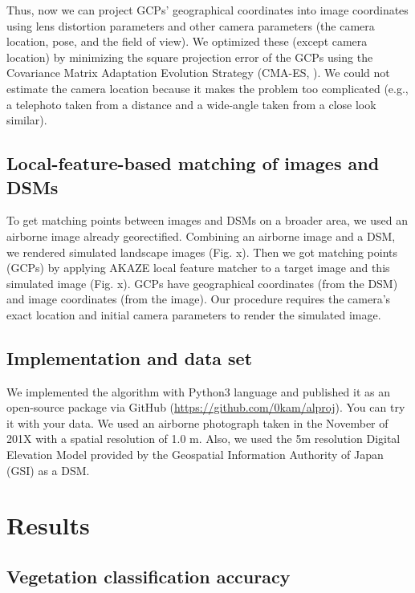 \documentclass{article}
\begin{document}
Thus, now we can project GCPs' geographical coordinates into image coordinates using lens distortion parameters and other camera parameters (the camera location, pose, and the field of view). We optimized these (except camera location) by minimizing the square projection error of the GCPs using the Covariance Matrix Adaptation Evolution Strategy (CMA-ES, \cite{Hansen2003CMAES}). We could not estimate the camera location because it makes the problem too complicated (e.g., a telephoto taken from a distance and a wide-angle taken from a close look similar).

\hypertarget{local-feature-based-matching-of-images-and-dsms}{%
\subsection{Local-feature-based matching of images and DSMs}\label{local-feature-based-matching-of-images-and-dsms}}

To get matching points between images and DSMs on a broader area, we used an airborne image already georectified. Combining an airborne image and a DSM, we rendered simulated landscape images (Fig. x). Then we got matching points (GCPs) by applying AKAZE local feature matcher to a target image and this simulated image (Fig. x). GCPs have geographical coordinates (from the DSM) and image coordinates (from the image). Our procedure requires the camera's exact location and initial camera parameters to render the simulated image.

\hypertarget{implementation-and-data-set}{%
\subsection{Implementation and data set}\label{implementation-and-data-set}}

We implemented the algorithm with Python3 language and published it as an open-source package via GitHub (\url{https://github.com/0kam/alproj}). You can try it with your data. We used an airborne photograph taken in the November of 201X with a spatial resolution of 1.0 m. Also, we used the 5m resolution Digital Elevation Model provided by the Geospatial Information Authority of Japan (GSI) as a DSM.

\hypertarget{results}{%
\section{Results}\label{results}}

\hypertarget{vegetation-classification-accuracy}{%
\subsection{Vegetation classification accuracy}\label{vegetation-classification-accuracy}}
\end{document}
